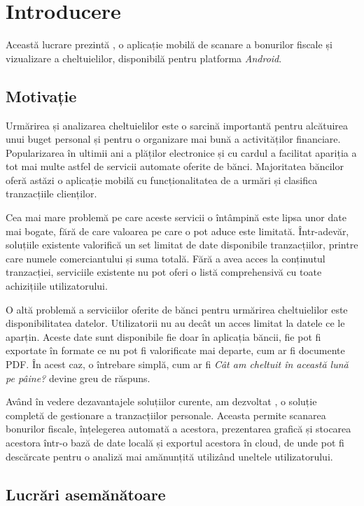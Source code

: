 \chapter{Introducere}\label{introducere}

Această lucrare prezintă \AppNameB, o aplicație mobilă de scanare a bonurilor fiscale și vizualizare a cheltuielilor, disponibilă pentru platforma \emph{Android}.

\section{Motivație}\label{motivatie_intro}

Urmărirea și analizarea cheltuielilor este o sarcină importantă pentru alcătuirea unui buget personal și pentru o organizare mai bună a activităților financiare. Popularizarea în ultimii ani a plăților electronice și cu cardul a facilitat apariția a tot mai multe astfel de servicii automate oferite de bănci. Majoritatea băncilor oferă astăzi o aplicație mobilă cu funcționalitatea de a urmări și clasifica tranzacțiile clienților.

Cea mai mare problemă pe care aceste servicii o întâmpină este lipsa unor date mai bogate, fără de care valoarea pe care o pot aduce este limitată. Într-adevăr, soluțiile existente valorifică un set limitat de date disponibile tranzacțiilor, printre care numele comerciantului și suma totală. Fără a avea acces la conținutul tranzacției, serviciile existente nu pot oferi o listă comprehensivă cu toate achizițiile utilizatorului.

O altă problemă a serviciilor oferite de bănci pentru urmărirea cheltuielilor este disponibilitatea datelor. Utilizatorii nu au decât un acces limitat la datele ce le aparțin. Aceste date sunt disponibile fie doar în aplicația băncii, fie pot fi exportate în formate ce nu pot fi valorificate mai departe, cum ar fi documente PDF. În acest caz, o întrebare simplă, cum ar fi \textit{Cât am cheltuit în această lună pe pâine?} devine greu de răspuns.

Având în vedere dezavantajele soluțiilor curente, am dezvoltat \AppName, o soluție completă de gestionare a tranzacțiilor personale. Aceasta permite scanarea bonurilor fiscale, înțelegerea automată a acestora, prezentarea grafică și stocarea acestora într-o bază de date locală și exportul acestora în cloud, de unde pot fi descărcate pentru o analiză mai amănunțită utilizând uneltele utilizatorului.

\section{Lucrări asemănătoare}\label{related_intro}

